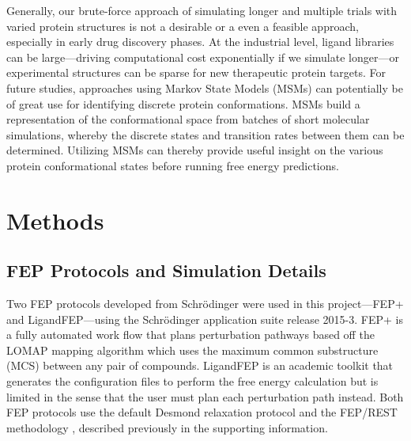\documentclass[journal=jctcce,manuscript=article]{achemso}
\begin{document}
Generally, our brute-force approach of simulating longer and multiple trials with varied protein structures is not a desirable or a even a feasible approach, especially in early drug discovery phases.
At the industrial level, ligand libraries can be large---driving computational cost exponentially if we simulate longer---or experimental structures can be sparse for new therapeutic protein targets.
For future studies, approaches using Markov State Models (MSMs)\cite{MSM} can potentially be of great use for identifying discrete protein conformations.
MSMs build a representation of the conformational space from batches of short molecular simulations, whereby the discrete states and transition rates between them can be determined.
Utilizing MSMs can thereby provide useful insight on the various protein conformational states before running free energy predictions. 

\section{Methods}
\subsection*{FEP Protocols and Simulation Details}
Two FEP protocols developed from Schr\"{o}dinger were used in this project---FEP+\cite{FEPplus} and LigandFEP\cite{LigandFEP}---using the Schr\"{o}dinger application suite release 2015-3.
FEP+ is a fully automated work flow that plans perturbation pathways based off the LOMAP \cite{LOMAP} mapping algorithm which uses the maximum common substructure (MCS) between any pair of compounds.
LigandFEP is an academic toolkit that generates the configuration files to perform the free energy calculation but is limited in the sense that the user must plan each perturbation path instead.
Both FEP protocols use the default Desmond relaxation protocol and the FEP/REST methodology \cite{REST,REST2,FEP/REST,FEP/RESTapp}, described previously \cite{FEPplus} in the supporting information.
\end{document}
